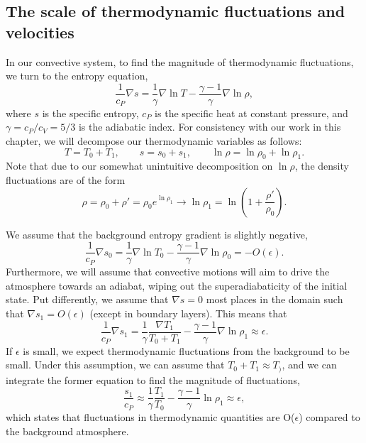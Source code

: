 \documentclass[aps, pre, onecolumn, nofootinbib, notitlepage, groupedaddress, amsfonts, amssymb, amsmath, longbibliography, superscriptaddress]{revtex4-1}
\newcommand{\grad}{\ensuremath{\nabla}}
\begin{document}
\subsection{The scale of thermodynamic fluctuations and velocities}
In our convective system, to find the magnitude of thermodynamic fluctuations, we turn to the entropy equation,
\begin{equation}
\frac{1}{c_P}\grad s = \frac{1}{\gamma}\grad\ln T - \frac{\gamma - 1}{\gamma}\grad \ln \rho,
\end{equation}
where $s$ is the specific entropy, $c_P$ is the specific heat at constant pressure, and $\gamma = c_P/c_V = 5/3$ is the adiabatic index.
For consistency with our work in this chapter, we will decompose our thermodynamic variables as follows:
$$
T = T_0 + T_1, \qquad
s = s_0 + s_1, \qquad
\ln\rho = \ln\rho_0 + \ln\rho_1.
$$
Note that due to our somewhat unintuitive decomposition on $\ln\rho$, the density fluctuations are of the form
$$
\rho = \rho_0 + \rho' = \rho_0 e^{\ln\rho_1} \rightarrow \ln\rho_1 = \ln\left(1 + \frac{\rho'}{\rho_0}\right).
$$

We assume that the background entropy gradient is slightly negative,
$$
\frac{1}{c_P}\grad s_0 = \frac{1}{\gamma}\grad\ln T_0 - \frac{\gamma - 1}{\gamma}\grad \ln \rho_0 = -O(\epsilon).
$$
Furthermore, we will assume that convective motions will aim to drive the atmosphere towards an adiabat, wiping out the superadiabaticity of the initial state.
Put differently, we assume that $\grad s = 0$ most places in the domain such that $\grad s_1 = O(\epsilon)$ (except in boundary layers).
This means that
$$
\frac{1}{c_P}\grad s_1 = \frac{1}{\gamma}\frac{\grad T_1}{T_0 + T_1} - \frac{\gamma - 1}{\gamma}\grad\ln\rho_1 \approx \epsilon.
$$
If $\epsilon$ is small, we expect thermodynamic fluctuations from the background to be small.
Under this assumption, we can assume that $T_0 + T_1 \approx T_)$, and we can integrate the former equation to find the magnitude of fluctuations,
\begin{equation}
\frac{s_1}{c_P} \approx \frac{1}{\gamma}\frac{T_1}{T_0} - \frac{\gamma-1}{\gamma}\ln\rho_1 \approx \epsilon,
\end{equation}
which states that fluctuations in thermodynamic quantities are O($\epsilon$) compared to the background atmosphere.
\end{document}

